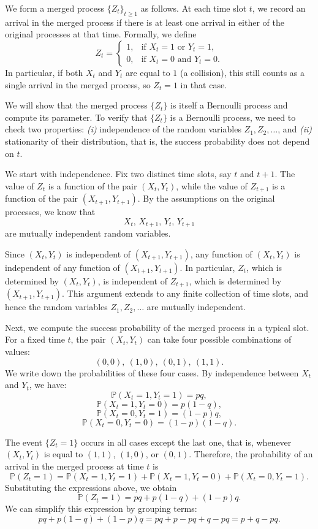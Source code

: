 We form a merged process \(\{Z_t\}_{t \geq 1}\) as follows.  
At each time slot \(t\), we record an arrival in the merged process if there is at least one arrival in either of the original processes at that time.  
Formally, we define
\[
Z_t =
\begin{cases}
1, & \text{if } X_t = 1 \text{ or } Y_t = 1,\\
0, & \text{if } X_t = 0 \text{ and } Y_t = 0.
\end{cases}
\]
In particular, if both \(X_t\) and \(Y_t\) are equal to \(1\) (a collision), this still counts as a single arrival in the merged process, so \(Z_t = 1\) in that case.  

We will show that the merged process \(\{Z_t\}\) is itself a Bernoulli process and compute its parameter.  
To verify that \(\{Z_t\}\) is a Bernoulli process, we need to check two properties:  
\textit{(i)} independence of the random variables \(Z_1, Z_2, \ldots\), and  
\textit{(ii)} stationarity of their distribution, that is, the success probability does not depend on \(t\).  

We start with independence.  
Fix two distinct time slots, say \(t\) and \(t+1\).  
The value of \(Z_t\) is a function of the pair \((X_t, Y_t)\), while the value of \(Z_{t+1}\) is a function of the pair \((X_{t+1}, Y_{t+1})\).  
By the assumptions on the original processes, we know that
\[
X_t, \, X_{t+1}, \, Y_t, \, Y_{t+1}
\]
are mutually independent random variables.  

Since \((X_t, Y_t)\) is independent of \((X_{t+1}, Y_{t+1})\), any function of \((X_t, Y_t)\) is independent of any function of \((X_{t+1}, Y_{t+1})\).  
In particular, \(Z_t\), which is determined by \((X_t, Y_t)\), is independent of \(Z_{t+1}\), which is determined by \((X_{t+1}, Y_{t+1})\).  
This argument extends to any finite collection of time slots, and hence the random variables \(Z_1, Z_2, \ldots\) are mutually independent.  

Next, we compute the success probability of the merged process in a typical slot.  
For a fixed time \(t\), the pair \((X_t, Y_t)\) can take four possible combinations of values:
\[
(0,0),\ (1,0),\ (0,1),\ (1,1).
\]
We write down the probabilities of these four cases.  
By independence between \(X_t\) and \(Y_t\), we have:
\[
\mathbb{P}(X_t = 1, Y_t = 1) = pq,
\]
\[
\mathbb{P}(X_t = 1, Y_t = 0) = p(1-q),
\]
\[
\mathbb{P}(X_t = 0, Y_t = 1) = (1-p)q,
\]
\[
\mathbb{P}(X_t = 0, Y_t = 0) = (1-p)(1-q).
\]

The event \(\{Z_t = 1\}\) occurs in all cases except the last one, that is, whenever \((X_t, Y_t)\) is equal to \((1,1)\), \((1,0)\), or \((0,1)\).  
Therefore, the probability of an arrival in the merged process at time \(t\) is
\[
\mathbb{P}(Z_t = 1)
=
\mathbb{P}(X_t = 1, Y_t = 1)
+
\mathbb{P}(X_t = 1, Y_t = 0)
+
\mathbb{P}(X_t = 0, Y_t = 1).
\]
Substituting the expressions above, we obtain
\[
\mathbb{P}(Z_t = 1)
=
pq + p(1-q) + (1-p)q.
\]
We can simplify this expression by grouping terms:
\[
pq + p(1-q) + (1-p)q
=
pq + p - pq + q - pq
=
p + q - pq.
\]

